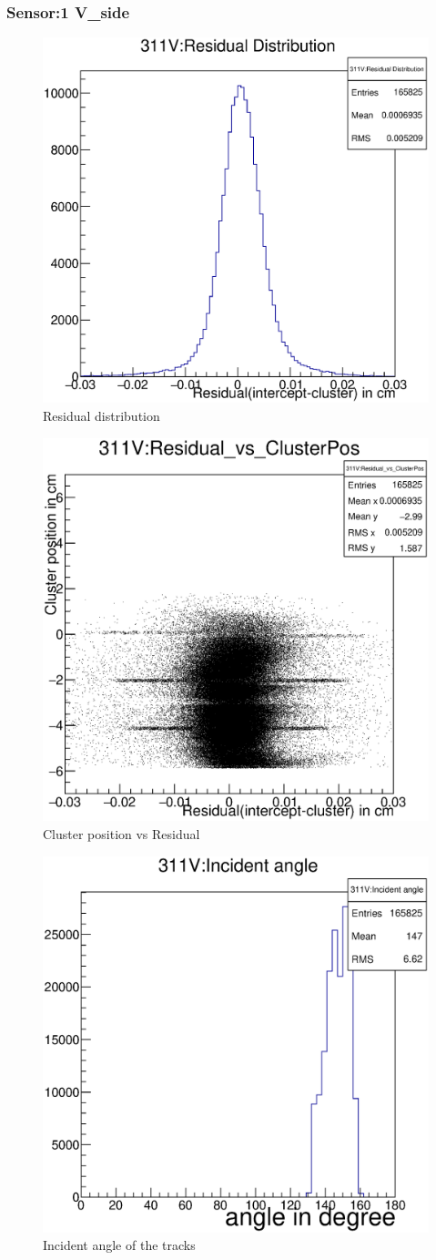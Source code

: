 \documentclass[12pt]{article}
\begin{document}
		\pagebreak
			\subsubsection{Sensor:1 V\_side}
	\begin{multicols}{3}
		\begin{figure}[H]
			\includegraphics[width=.3\textwidth]{311V:residualplot.eps}	
			\caption{Residual distribution}	
			\label{fig1}	
		\end{figure}
		\begin{figure}[H]
			\includegraphics[width=.3\textwidth]{311V:residual_vs_clusterpos.eps}	
			\caption{Cluster position vs Residual}	
			\label{fig2}	
		\end{figure}
		\begin{figure}[H]
			\includegraphics[width=.3\textwidth]{311V:incident_angle.eps}	
			\caption{Incident angle of the tracks}	
			\label{fig2}	
		\end{figure}
	\end{multicols}
	
\end{document}
